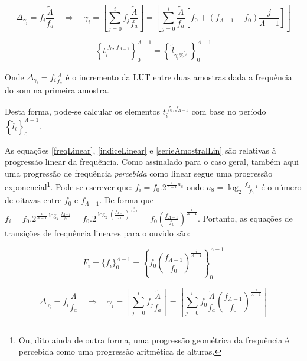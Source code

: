 \begin{equation}\label{indiceLinear}
\Delta_{\gamma_i}=f_i\frac{\widetilde{\Lambda}}{f_a} \quad \Rightarrow \quad \gamma_i=\left \lfloor \sum_{j=0}^{i} f_j\frac{\widetilde{\Lambda}}{f_a} \right \rfloor   =\left \lfloor \sum_{j=0}^{i} \frac{\widetilde{\Lambda}}{f_a} \left [f_0 + (f_{\Lambda-1}-f_0)\frac{j}{\Lambda-1} \right ] \right \rfloor 
\end{equation}

\begin{equation}\label{serieAmostralLin}
\left\{t_i^{\;\overline{f_0,\, f_{\Lambda-1}}}\right\}_0^{\Lambda-1}=\left\{\,\widetilde{l}_{\gamma_i \% \widetilde{\Lambda}}\,\right\}_0^{\Lambda-1}
\end{equation}

Onde $\Delta_{\gamma_i}=f_i\frac{\widetilde{\Lambda}}{f_a}$ é o incremento da LUT entre duas amostras dada a frequência do som na primeira amostra.

Desta forma, pode-se calcular os elementos $t_i^{\;\overline{f_0,f_{\Lambda-1}}}$
com base no período $\left\{\widetilde{l}_i\right\}_0^{\Lambda-1}$.

As equações \ref{freqLinear}, \ref{indiceLinear} e \ref{serieAmostralLin} são relativas à progressão linear
da frequência. Como assinalado para o caso geral, também aqui
uma progressão de frequência
\emph{percebida} como linear segue uma progressão exponencial\footnote{Ou,
dito ainda de outra forma, uma progressão geométrica da frequência
é percebida como uma progressão aritmética de alturas.}.
Pode-se escrever que: $f_i=f_0 . 2^{\frac{i}{\Lambda-1} n_8}$ onde 
$n_8=\log_2\frac{f_{\Lambda-1}}{f_0}$ é o número de oitavas entre $f_0$ e $f_{\Lambda-1}$.
De forma que $f_i=f_0 . 2^{\frac{i}{\Lambda-1}\log_2\frac{f_{\Lambda-1}}{f_0}}=
f_0 . 2^{\log_2\left ( \frac{f_{\Lambda-1}}{f_0} \right )^{\frac{i}{\Lambda-1}}}=
f_0 \left ( \frac{f_{\Lambda-1}}{f_0} \right ) ^{\frac{i}{\Lambda -1}}$. Portanto,
 as equações de transições de frequência
lineares para o ouvido são:

\begin{equation}
F_i=\{f_i\}_0^{\Lambda-1}=\left\{f_0 \left ( \frac{f_{\Lambda-1}}{f_0} \right ) ^{\frac{i}{\Lambda -1}} \right\}_0^{\Lambda-1}
\end{equation}

\begin{equation}\label{indiceExponencial}
\Delta_{\gamma_i}=f_i\frac{\widetilde{\Lambda}}{f_a} \quad \Rightarrow \quad \gamma_i=\left \lfloor \sum_{j=0}^{i} f_j\frac{\widetilde{\Lambda}}{f_a} \right \rfloor   =\left \lfloor \sum_{j=0}^{i} f_0 \frac{\widetilde{\Lambda}}{f_a} \left ( \frac{f_{\Lambda-1}}{f_0} \right ) ^{\frac{j}{\Lambda -1}} \right \rfloor
\end{equation}

